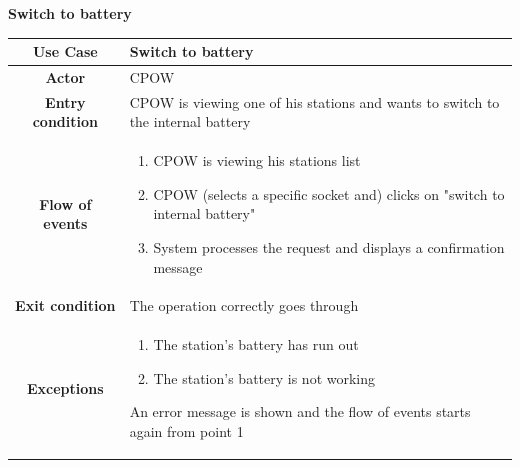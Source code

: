 \documentclass[table, 12pt]{article} %
\begin{document}
\begin{itemize}
            \begin{table}[H]
                \item[] \textbf{Switch to battery}
                \item[]
                \centering
                \begin{tabular}{|c |m{}|}
                    \hline
                    \textbf{Use Case} & Switch to battery\\ \hline
                    \textbf{Actor} & CPOW\\ \hline
                    \textbf{Entry condition} & CPOW is viewing one of his stations and wants to switch to the internal battery\\  \hline
                    \textbf{Flow of events} & \begin{enumerate}
                                                \item CPOW is viewing his stations list
                                                \item CPOW (selects a specific socket and) clicks on "switch to internal battery"
                                                \item System processes the request and displays a confirmation message
                                            \end{enumerate}\\ \hline
                    \textbf{Exit condition} &  The operation correctly goes through\\ \hline
                    \textbf{Exceptions} &  \begin{enumerate}
                        \item The station's battery has run out
                        \item The station's battery is not working
                    \end{enumerate}
                    An error message is shown and the flow of events starts again from point 1\\ \hline
                \end{tabular}
            \end{table}



\end{itemize}
\end{document}
